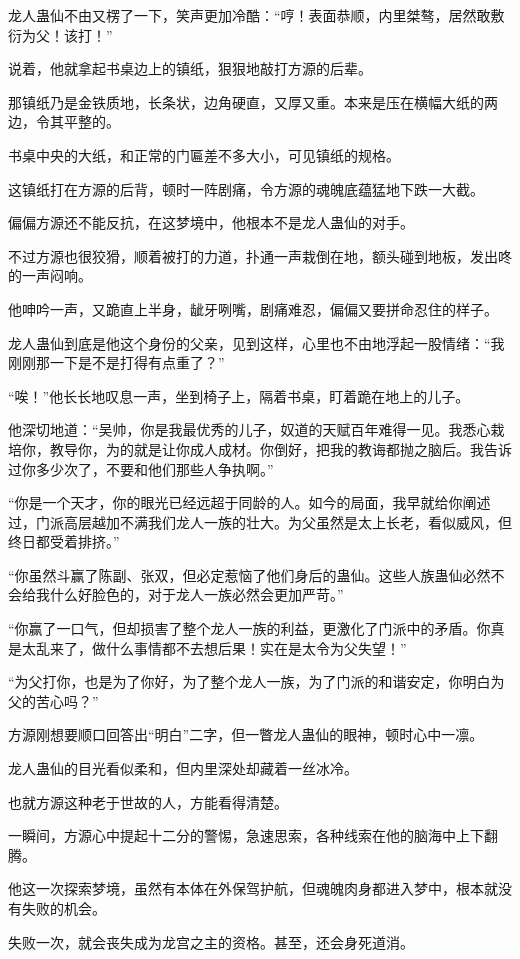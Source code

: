 \begin{this_body}
龙人蛊仙不由又楞了一下，笑声更加冷酷：“哼！表面恭顺，内里桀骜，居然敢敷衍为父！该打！”

说着，他就拿起书桌边上的镇纸，狠狠地敲打方源的后辈。

那镇纸乃是金铁质地，长条状，边角硬直，又厚又重。本来是压在横幅大纸的两边，令其平整的。

书桌中央的大纸，和正常的门匾差不多大小，可见镇纸的规格。

这镇纸打在方源的后背，顿时一阵剧痛，令方源的魂魄底蕴猛地下跌一大截。

偏偏方源还不能反抗，在这梦境中，他根本不是龙人蛊仙的对手。

不过方源也很狡猾，顺着被打的力道，扑通一声栽倒在地，额头碰到地板，发出咚的一声闷响。

他呻吟一声，又跪直上半身，龇牙咧嘴，剧痛难忍，偏偏又要拼命忍住的样子。

龙人蛊仙到底是他这个身份的父亲，见到这样，心里也不由地浮起一股情绪：“我刚刚那一下是不是打得有点重了？”

“唉！”他长长地叹息一声，坐到椅子上，隔着书桌，盯着跪在地上的儿子。

他深切地道：“吴帅，你是我最优秀的儿子，奴道的天赋百年难得一见。我悉心栽培你，教导你，为的就是让你成人成材。你倒好，把我的教诲都抛之脑后。我告诉过你多少次了，不要和他们那些人争执啊。”

“你是一个天才，你的眼光已经远超于同龄的人。如今的局面，我早就给你阐述过，门派高层越加不满我们龙人一族的壮大。为父虽然是太上长老，看似威风，但终日都受着排挤。”

“你虽然斗赢了陈副、张双，但必定惹恼了他们身后的蛊仙。这些人族蛊仙必然不会给我什么好脸色的，对于龙人一族必然会更加严苛。”

“你赢了一口气，但却损害了整个龙人一族的利益，更激化了门派中的矛盾。你真是太乱来了，做什么事情都不去想后果！实在是太令为父失望！”

“为父打你，也是为了你好，为了整个龙人一族，为了门派的和谐安定，你明白为父的苦心吗？”

方源刚想要顺口回答出“明白”二字，但一瞥龙人蛊仙的眼神，顿时心中一凛。

龙人蛊仙的目光看似柔和，但内里深处却藏着一丝冰冷。

也就方源这种老于世故的人，方能看得清楚。

一瞬间，方源心中提起十二分的警惕，急速思索，各种线索在他的脑海中上下翻腾。

他这一次探索梦境，虽然有本体在外保驾护航，但魂魄肉身都进入梦中，根本就没有失败的机会。

失败一次，就会丧失成为龙宫之主的资格。甚至，还会身死道消。


\end{this_body}
